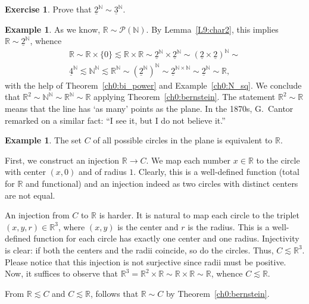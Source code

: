 \documentclass[12pt,notitlepage]{article}
\theoremstyle{plain}
\theoremstyle{definition}
\newtheorem{exc}[thm]{Exercise}
\newtheorem{exm}[thm]{Example}
\theoremstyle{plain}
\newcommand{\N}{\mathbb{N}}
\newcommand{\R}{\mathbb{R}}
\newcommand{\mP}{\mathcal{P}}
\newcommand{\ul}[1]{\underline{#1}}
\newcommand{\1}{\mathbf{1}}
\newcommand{\0}{\mathbf{0}}
\begin{document}
\begin{exc}
Prove that $\ul{2}^\N \sim \ul{3}^\N$.
\end{exc}

\begin{exm}\label{eq_sets:big_exm}
As we know, $\R \sim \mP(\N)$. By Lemma~\ref{L9:char2}, this implies $\R \sim \ul{2}^\N$, whence
\begin{multline*}
\R \sim \R \times \{0\} \lesssim \R \times \R \sim \ul{2}^\N \times \ul{2}^\N \sim (\ul{2} \times \ul{2})^\N \sim\\
 \ul{4}^\N \lesssim \N^\N \lesssim \R^\N \sim (\ul{2}^\N)^\N \sim \ul{2}^{\N \times \N} \sim \ul{2}^\N \sim \R,
\end{multline*}
with the help of Theorem~\ref{ch0:bi_power} and Example~\ref{ch0:N_sq}. We conclude that $\R^2 \sim \N^\N \sim \R^\N \sim \R$ applying Theorem~\ref{ch0:bernstein}. The statement $\R^2 \sim \R$ means that the line has `as many' points as the plane. In the 1870s, G.~Cantor remarked on a similar fact: ``I see it, but I do not believe it.''
\end{exm}

\begin{exm}
The set $C$ of all possible circles in the plane is equivalent to $\R$.

First, we construct an injection $\R \to C$. We map each number $x \in \R$ to the circle with center $(x, 0)$ and of radius $1$. Clearly, this is a well-defined function (total for $\R$ and functional) and an injection indeed as two circles with distinct centers are not equal.

An injection from $C$ to $\R$ is harder. It is natural to map each circle to the triplet $(x, y, r) \in \R^3$, where $(x, y)$ is the center and $r$ is the radius. This is a well-defined function for each circle has exactly one center and one radius. Injectivity is clear: if both the centers and the radii coincide, so do the circles. Thus, $C \lesssim \R^3$. Please notice that this injection is not surjective since radii must be positive. Now, it suffices to observe that $\R^3 = \R^2 \times \R \sim \R \times \R \sim \R$, whence $C \lesssim \R$. 

From $\R \lesssim C$ and $C \lesssim \R$, follows that $\R \sim C$ by Theorem~\ref{ch0:bernstein}.
\end{exm}
\end{document}

